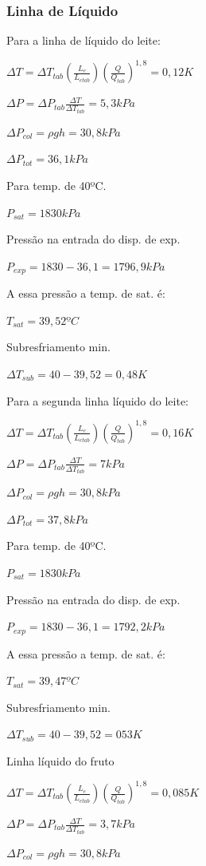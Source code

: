 \documentclass[10pt,a4paper]{article}
\begin{document}
\subsubsection{Linha de Líquido}

Para a linha de líquido do leite:

$\Delta T = \Delta T_{tab} (\frac{L_e}{L_{etab}}) (\frac{Q}{Q_{tab}})^{1,8} = 0,12 K$

$\Delta P = \Delta P_{tab} \frac{\Delta T}{\Delta T_{tab}} = 5,3 kPa$

$\Delta P_{col} = \rho g h = 30,8 kPa$

$\Delta P_{tot} = 36,1 kPa$

Para temp. de 40ºC.

$P_{sat} = 1830 kPa$

Pressão na entrada do disp. de exp.

$P_{exp} = 1830 - 36,1 = 1796,9 kPa$

A essa pressão a temp. de sat. é:

$T_{sat} = 39,52ºC$

Subresfriamento min.

$\Delta T_{sub} = 40 - 39,52 = 0,48K$

Para a segunda linha líquido do leite:

$\Delta T = \Delta T_{tab} (\frac{L_e}{L_{etab}}) (\frac{Q}{Q_{tab}})^{1,8} = 0,16 K$

$\Delta P = \Delta P_{tab} \frac{\Delta T}{\Delta T_{tab}} = 7 kPa$

$\Delta P_{col} = \rho g h = 30,8 kPa$

$\Delta P_{tot} = 37,8 kPa$

Para temp. de 40ºC.

$P_{sat} = 1830 kPa$

Pressão na entrada do disp. de exp.

$P_{exp} = 1830 - 36,1 = 1792,2 kPa$

A essa pressão a temp. de sat. é:

$T_{sat} = 39,47ºC$

Subresfriamento min.

$\Delta T_{sub} = 40 - 39,52 = 053K$

Linha líquido do fruto

$\Delta T = \Delta T_{tab} (\frac{L_e}{L_{etab}}) (\frac{Q}{Q_{tab}})^{1,8} = 0,085 K$

$\Delta P = \Delta P_{tab} \frac{\Delta T}{\Delta T_{tab}} = 3,7 kPa$

$\Delta P_{col} = \rho g h = 30,8 kPa$
\end{document}

